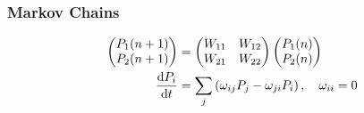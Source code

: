 \documentclass[a4paper, english, 12pt]{article}
\newcommand{\closed}[1]{\left( #1 \right)}
\begin{document}
\begin{multicols*}{2}
\subsubsection*{Markov Chains}

\begin{align*}
    \begin{pmatrix}
        P_1 (n+1) \\
        P_2 (n+1)
    \end{pmatrix}
    &= \begin{pmatrix}
        W_{11} & W_{12} \\ 
        W_{21} & W_{22}
    \end{pmatrix}
    \begin{pmatrix}
        P_1 (n) \\
        P_2 (n)
    \end{pmatrix} \\ 
    \dv{P_i}{t} &= \sum_{j} \closed{\omega_{ij}P_j - \omega_{ji}P_i},\quad \omega_{ii}=0
\end{align*}


\end{multicols*}
\end{document}
